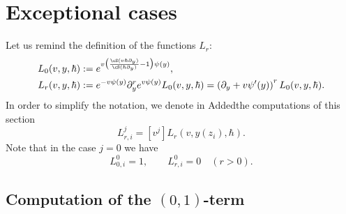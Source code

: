 \section{Exceptional cases}\label{sec:exceptions}

Let us remind the definition of the functions $L_r$:
\begin{align*}
L_0(v,y,\hbar)&:=e^{v\bigl(\frac{\cS(v\hbar\partial_y)}{\cS(\hbar\partial_y)}-1\bigr)\psi(y)},\\
L_r(v,y,\hbar)&:=e^{-v\psi(y)}\partial_y^re^{v\psi(y)}L_0(v,y,\hbar)
=\left(\partial_y+v\psi'(y)\right)^rL_0(v,y,\hbar).
\end{align*}
In order to simplify the notation, we denote in Added{the} computations of this section
\begin{equation*}
L_{r,i}^j=[v^j]L_r(v,y(z_i),\hbar).
\end{equation*}
Note that in the case $j=0$ we have
\begin{equation*}
L_{0,i}^0=1,\qquad L_{r,i}^0=0\quad (r>0).
\end{equation*}

\subsection{Computation of the \texorpdfstring{$(0,1)$}{(0,1)}-term}

